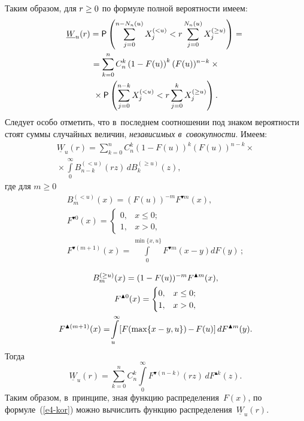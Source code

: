 \begin{multicols}{2}
Таким образом, для $r\hm\ge 0$ по формуле полной вероятности имеем:
\begin{multline}
\underline{W}_u(r)={\sf P}\left(\sum\limits_{j=0}^{n-N_n(u)}X_j^{(<u)}<
r\sum\limits_{j=0}^{N_n(u)}X_j^{(\ge u)}\right) ={}
\\
{}=\sum\limits_{k=0}^nC_n^k\left(1-F(u)\right)^k(F(u))^{n-k}\times{}\\
{}\times {\sf P}
\left(\sum\limits_{j=0}^{n-k}X_j^{(<u)}<r\sum\limits_{j=0}^{k}X_j^{(\ge
u)}\right).
\label{e3-kor}
\end{multline}
Следует особо отметить, что в~последнем соотношении под 
знаком вероятности стоят суммы случайных величин,
\textit{независимых в~совокупности}.\linebreak
Имеем:
\begin{multline*}
\underline{W}_u(r)=\sum\limits_{k=0}^nC_n^k(1-F(u))^k(F(u))^{n-k}\times{}\\
{}\times
\int\limits_0^{\infty}B^{(<u)}_{n-k}(rz)\,dB^{(\ge u)}_k(z),
\end{multline*}
где для $m\ge0$
\begin{gather*} 
B^{(<u)}_m(x)=(F(u))^{-m}F^{\blacktriangledown m}(x),\\
F^{\blacktriangledown 0}(x)=
\begin{cases}
0, & x\le0;\\
1, &x>0,
\end{cases}\\  
F^{\blacktriangledown
(m+1)}(x)=\int\limits_{0}^{\min\{x,u\}}F^{\blacktriangledown m}(x-y)dF(y)\,;
\end{gather*}


\noindent
\begin{gather*}
B^{(\ge u)}_m(x)=(1-F(u))^{-m}F^{\blacktriangle m}(x),\\
F^{\blacktriangle 0}(x)=
\begin{cases}
0, & x\le0;\\
1, & x>0,
\end{cases}\\
F^{\blacktriangle
(m+1)}(x)=\!
\int\limits_{u}^{\infty}\!
\left[F(\max\{x-y,u\})\hspace*{-.7pt}-\hspace*{-.7pt}F(u)\right]dF^{\blacktriangle m}(y).
\end{gather*}
Тогда
\begin{equation}
\underline{W}_u(r)=\sum\limits_{k=0}^n C_n^k\int\limits_0^{\infty}
F^{\blacktriangledown (n-k)}(rz)\,dF^{\blacktriangle k}(z).\label{e4-kor}
\end{equation}
Таким образом, в~принципе, зная функцию распределения~$F(x)$, по
формуле~(\ref{e4-kor}) можно вычислить функцию распределения~$\underline{W}_u(r)$.


\end{multicols}
